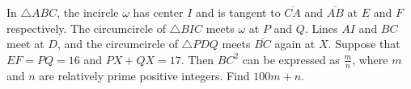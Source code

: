 In $\triangle ABC$, the incircle $\omega$ has center $I$ and is tangent to $\overline{CA}$ and $\overline{AB}$ at $E$ and $F$ respectively. The circumcircle of $\triangle{BIC}$ meets $\omega$ at $P$ and $Q$. Lines $AI$ and $BC$ meet at $D$, and the circumcircle of $\triangle PDQ$ meets $\overline{BC}$ again at $X$. Suppose that $EF = PQ = 16$ and $PX + QX = 17$. Then $BC^2$ can be expressed as $\frac mn$, where $m$ and $n$ are relatively prime positive integers. Find $100m + n$.
